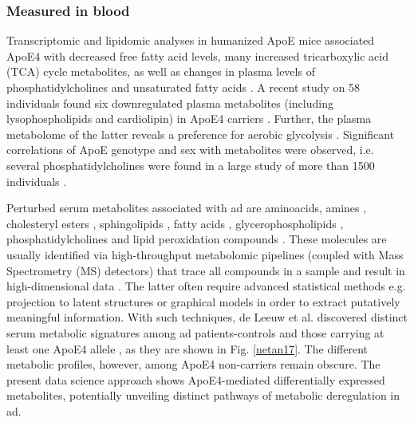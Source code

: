 \documentclass{amsart}
\begin{document}
\subsubsection{Measured in blood}
Transcriptomic and lipidomic analyses in humanized ApoE mice associated ApoE4 with decreased free fatty acid levels, many increased  tricarboxylic acid (TCA) cycle metabolites, as well as changes in plasma levels of phosphatidylcholines and unsaturated fatty acids \cite{Area-Gomez2020APOE4Mice, Zhao2020AlzheimersPathways}. A recent study on 58 individuals found six downregulated plasma metabolites (including lysophospholipids and cardiolipin) in ApoE4 carriers \cite{pena-bautista2020MetabolomicsEffect}. Further, the plasma metabolome of the latter reveals a preference for aerobic glycolysis \cite{Farmer2021APO4Glycolysis}. Significant correlations of ApoE genotype and sex with metabolites were observed, i.e. several phosphatidylcholines were found in a large study of more than 1500 individuals \cite{Arnold2020SexMetabolome}.

Perturbed serum metabolites associated with \acrshort{ad} are aminoacids, amines \cite{deLeeuw2017Blood-basedDisease, Green2023InvestigatingDisease}, cholesteryl esters \cite{Proitsi2017AssociationAnalysis}, sphingolipids \cite{Varma2018BrainStudy,Sun2022AssociationDisease,Green2023InvestigatingDisease,Oeckl2019GlialImpairment,Barupal2019SetsPathophysiology}, fatty acids \cite{Fernandez-Calle2022APOEDiseases,deLeeuw2017Blood-basedDisease}, glycerophospholipids \cite{Varma2018BrainStudy, Jia2022ATypes,Huo2020BrainAnalysis, Weng2019TheImpairment}, phosphatidylcholines \cite{Simpson2016BloodAging} and lipid peroxidation compounds \cite{Fernandez-Calle2022APOEDiseases}. These molecules are usually identified via high-throughput metabolomic pipelines (coupled with Mass Spectrometry (MS) detectors) that trace all compounds in a sample and result in high-dimensional data \cite{Oka2023MultiomicsCohort}. The latter often require advanced statistical methods e.g. projection to latent structures \cite{Weng2019TheImpairment, Peeters2019StableData} or graphical models \cite{Peeters2022Rags2ridges:Matrices} in order to extract putatively meaningful information. 
With such techniques, de Leeuw et al. discovered distinct serum metabolic signatures among \acrshort{ad} patients-controls and those carrying at least one ApoE4 allele \cite{deLeeuw2017Blood-basedDisease}, as they are shown in Fig. \ref{netan17}. The different metabolic profiles, however, among ApoE4 non-carriers remain obscure. The present data science approach shows ApoE4-mediated differentially expressed metabolites, potentially unveiling distinct pathways of metabolic deregulation in \acrshort{ad}.
\end{document}
